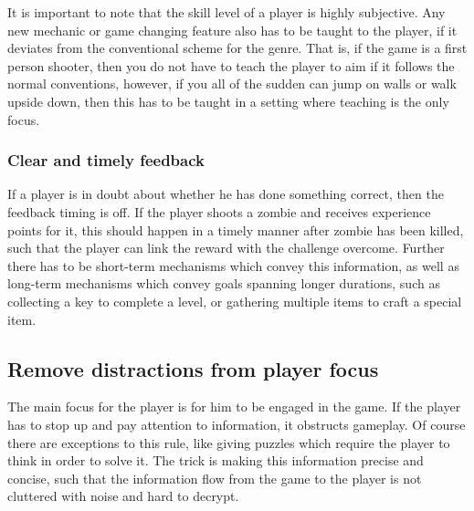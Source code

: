 It is important to note that the skill level of a player is highly subjective.
Any new mechanic or game changing feature also has to be taught to the player, if it deviates from the conventional scheme for the genre. 
That is, if the game is a first person shooter, then you do not have to teach the player to aim if it follows the normal conventions, however, if you all of the sudden can jump on walls or walk upside down, then this has to be taught in a setting where teaching is the only focus.

\subsubsection{Clear and timely feedback}
If a player is in doubt about whether he has done something correct, then the feedback timing is off.
If the player shoots a zombie and receives experience points for it, this should happen in a timely manner after zombie has been killed, such that the player can link the reward with the challenge overcome.
Further there has to be short-term mechanisms which convey this information, as well as long-term mechanisms which convey goals spanning longer durations,
such as collecting a key to complete a level, or gathering multiple items to craft a special item.

\subsection{Remove distractions from player focus}
The main focus for the player is for him to be engaged in the game.
If the player has to stop up and pay attention to information, it obstructs gameplay.
Of course there are exceptions to this rule, like giving puzzles which require the player to think in order to solve it.
The trick is making this information precise and concise, such that the information flow from the game to the player is not cluttered with noise and hard to decrypt.
